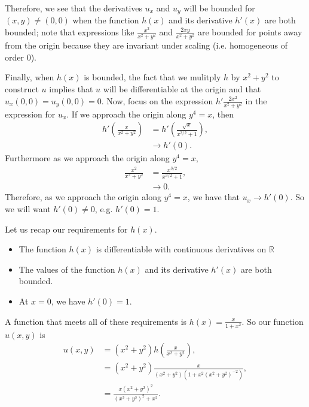 Therefore, we see that the derivatives \(u_x\) and \(u_y\) will be bounded for \((x,y) \neq (0,0)\) when the function \(h(x)\) and its derivative \(h'(x)\) are both bounded; note that expressions like
\(\frac{x^2}{x^2 + y^2}\) and \(\frac{2xy}{x^2 + y^2}\) are bounded for points away from the origin because they are invariant under scaling (i.e. homogeneous of order 0).

Finally, when \(h(x)\) is bounded, the fact that we mulitply \(h\) by \(x^2 + y^2\) to construct \(u\) implies that \(u\) will be differentiable at the origin and that \(u_x(0,0) = u_y(0,0) = 0\).
Now, focus on the expression \(h' \frac{2x^2}{x^2 + y^2}\) in the expression for \(u_x\). If we approach the origin along \(y^4 = x\), then
\begin{align}
h'\left(\frac{x}{x^2 + y^2}\right) & = h'\left(\frac{\sqrt{x}}{x^{3/2} + 1}\right) ,\\
    & \to h'(0).
\end{align} 
Furthermore as we approach the origin along \(y^4 = x\), 
\begin{align}
\frac{x^2}{x^2 + y^2} & = \frac{x^{3/2}}{x^{3/2} + 1}, \\
    & \to 0. 
\end{align}
Therefore, as we approach the origin along \(y^4 = x\), we have that \(u_x \to h'(0)\). So we will want \(h'(0) \neq 0\), e.g. \(h'(0) = 1\).

Let us recap our requirements for \(h(x)\).
\begin{itemize}
\item The function \(h(x)\) is differentiable with continuous derivatives on \(\mathbb R\)
\item The values of the function \(h(x)\) and its derivative \(h'(x)\) are both bounded.
\item At \(x = 0\), we have \(h'(0) = 1\).
\end{itemize}

A function that meets all of these requirements is \(h(x) = \frac{x}{1 + x^2}\). So our function \(u(x,y)\) is
\begin{align}
u(x,y) & = (x^2 + y^2) h\left(\frac{x}{x^2 + y^2}\right), \\
    & = (x^2 + y^2) \frac{x}{(x^2+y^2)(1 + x^2 (x^2 + y^2)^{-2})}, \\
    & = \frac{x(x^2 + y^2)^2}{(x^2 + y^2)^2 + x^2}.
\end{align}


